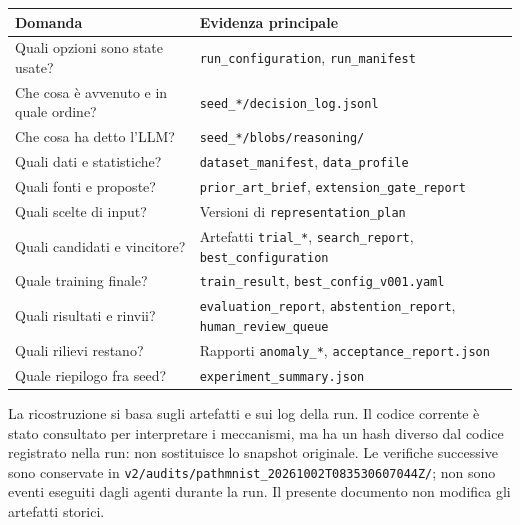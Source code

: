 \documentclass[11pt,a4paper]{article}
\newcommand{\artefatto}[1]{\nolinkurl{#1}}
\newcommand{\file}[1]{\nolinkurl{#1}}
\begin{document}
\begin{tabularx}{\textwidth}{@{}lX@{}}
\toprule
\textbf{Domanda} & \textbf{Evidenza principale}\\
\midrule
Quali opzioni sono state usate? & \artefatto{run_configuration}, \artefatto{run_manifest}\\
Che cosa è avvenuto e in quale ordine? & \file{seed_*/decision_log.jsonl}\\
Che cosa ha detto l'LLM? & \file{seed_*/blobs/reasoning/}\\
Quali dati e statistiche? & \artefatto{dataset_manifest}, \artefatto{data_profile}\\
Quali fonti e proposte? & \artefatto{prior_art_brief}, \artefatto{extension_gate_report}\\
Quali scelte di input? & Versioni di \artefatto{representation_plan}\\
Quali candidati e vincitore? & Artefatti \artefatto{trial_*}, \artefatto{search_report}, \artefatto{best_configuration}\\
Quale training finale? & \artefatto{train_result}, \file{best_config_v001.yaml}\\
Quali risultati e rinvii? & \artefatto{evaluation_report}, \artefatto{abstention_report}, \artefatto{human_review_queue}\\
Quali rilievi restano? & Rapporti \artefatto{anomaly_*}, \file{acceptance_report.json}\\
Quale riepilogo fra seed? & \file{experiment_summary.json}\\
\bottomrule
\end{tabularx}

La ricostruzione si basa sugli artefatti e sui log della run. Il codice corrente
è stato consultato per interpretare i meccanismi, ma ha un hash diverso dal
codice registrato nella run: non sostituisce lo snapshot originale.
Le verifiche successive sono conservate in
\file{v2/audits/pathmnist_20261002T083530607044Z/}; non sono eventi eseguiti dagli
agenti durante la run. Il presente documento non modifica gli artefatti storici.
\end{document}
